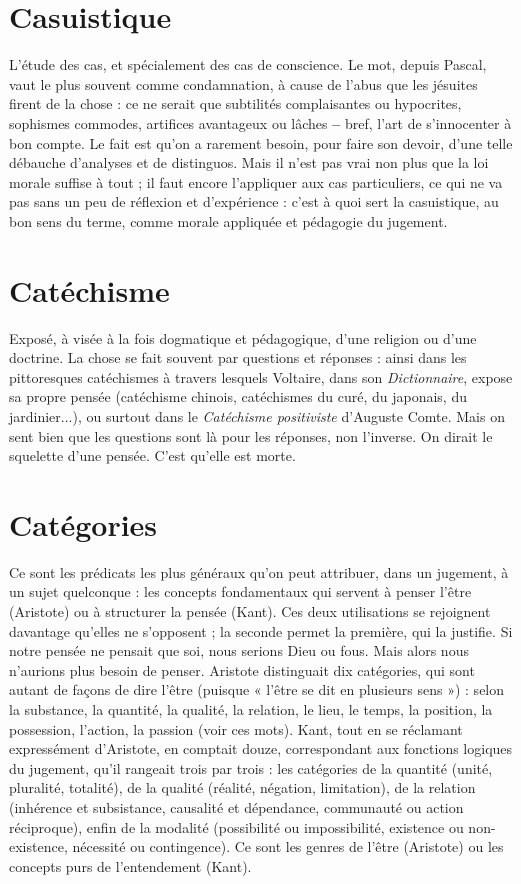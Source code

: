 \section{Casuistique}
L'étude des cas, et spécialement des cas de conscience. Le
mot, depuis Pascal, vaut le plus souvent comme condamnation,
à cause de l’abus que les jésuites firent de la chose : ce ne serait que subtilités
complaisantes ou hypocrites, sophismes commodes, artifices avantageux
ou lâches {\bf --} bref, l’art de s’innocenter à bon compte. Le fait est qu’on a rarement
besoin, pour faire son devoir, d’une telle débauche d’analyses et de distinguos.
Mais il n’est pas vrai non plus que la loi morale suffise à tout ; il faut
encore l’appliquer aux cas particuliers, ce qui ne va pas sans un peu de réflexion
et d'expérience : c’est à quoi sert la casuistique, au bon sens du terme, comme
morale appliquée et pédagogie du jugement.

\section{Catéchisme}
Exposé, à visée à la fois dogmatique et pédagogique, d’une
religion ou d’une doctrine. La chose se fait souvent par questions
et réponses : ainsi dans les pittoresques catéchismes à travers lesquels Voltaire,
dans son {\it Dictionnaire}, expose sa propre pensée (catéchisme chinois, catéchismes
du curé, du japonais, du jardinier...), ou surtout dans le {\it Catéchisme
positiviste} d’Auguste Comte. Mais on sent bien que les questions sont là pour
les réponses, non l'inverse. On dirait le squelette d’une pensée. C’est qu’elle est
morte.

\section{Catégories}
Ce sont les prédicats les plus généraux qu’on peut attribuer,
dans un jugement, à un sujet quelconque : les concepts fondamentaux
qui servent à penser l’être (Aristote) ou à structurer la pensée
(Kant). Ces deux utilisations se rejoignent davantage qu’elles ne s’opposent ; la
seconde permet la première, qui la justifie. Si notre pensée ne pensait que soi,
nous serions Dieu ou fous. Mais alors nous n’aurions plus besoin de penser.
Aristote distinguait dix catégories, qui sont autant de façons de dire l’être
(puisque « l'être se dit en plusieurs sens ») : selon la substance, la quantité, la
qualité, la relation, le lieu, le temps, la position, la possession, l’action, la passion
(voir ces mots). Kant, tout en se réclamant expressément d’Aristote, en
comptait douze, correspondant aux fonctions logiques du jugement, qu’il rangeait
trois par trois : les catégories de la quantité (unité, pluralité, totalité), de
la qualité (réalité, négation, limitation), de la relation (inhérence et subsistance,
causalité et dépendance, communauté ou action réciproque), enfin de la modalité
(possibilité ou impossibilité, existence ou non-existence, nécessité ou
contingence). Ce sont les genres de l’être (Aristote) ou les concepts purs de
l’entendement (Kant).

